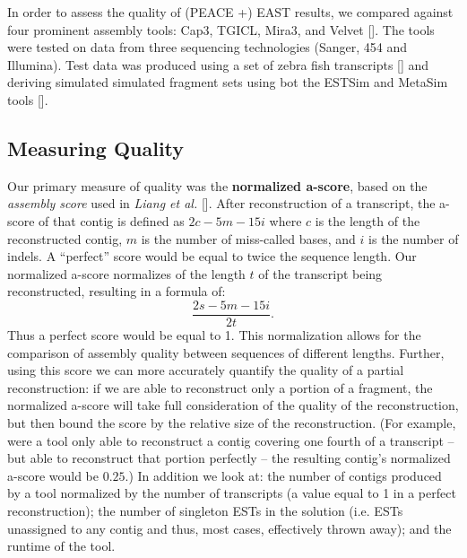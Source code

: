 \documentclass{bioinfo}
\newcommand{\peace} {{\small PEACE}}
\newcommand{\capthree} {{\small Cap3}}
\newcommand{\estsim}{{\small ESTSim}}
\newcommand{\metasim} {{\small MetaSim}}
\newcommand{\tgicl} {{\small TGICL}}
\newcommand{\east} {{\small EAST}}
\newcommand{\velvet}{{\small Velvet}}
\newcommand{\mira}{{\small Mira3}}
\begin{document}

In order to assess the quality of (\peace\/ +) \east\/ results, we
compared against four prominent assembly tools: \capthree, \tgicl,
\mira, and \velvet\/ [\cite{Huang99,Pertea03,Chevreux04,Zerbino08}].
The tools were tested on data from three sequencing technologies
(Sanger, 454 and Illumina).  Test data was produced using a set of
zebra fish transcripts [\cite{Hazelhurst08}] and deriving simulated
simulated fragment sets using bot the \estsim\/ and \metasim\/ tools
[\cite{Hazelhurst03,Richter08}].

\subsection*{Measuring Quality}
Our primary measure of quality was the {\bf normalized a-score}, based
on the {\it assembly score} used in {\it Liang et al.}
[\cite{Liang00}].  After reconstruction of a transcript,
the a-score of that contig is defined as $2c - 5m - 15i$ where $c$ is
the length of the reconstructed contig, $m$ is the number of
miss-called bases, and $i$ is the number of indels.  A ``perfect''
score would be equal to twice the sequence length.  Our normalized
a-score normalizes of the length $t$ of the transcript being
reconstructed, resulting in a formula of:
$$\frac{2s - 5m - 15i}{2t}.$$
Thus a perfect score would be equal to 1.  This normalization allows
for the comparison of assembly quality between sequences of different
lengths. Further, using this score we can more accurately quantify the
quality of a partial reconstruction: if we are able to reconstruct
only a portion of a fragment, the normalized a-score will take full
consideration of the quality of the reconstruction, but then bound the
score by the relative size of the reconstruction.  (For example, were
a tool only able to reconstruct a contig covering one fourth of a
transcript -- but able to reconstruct that portion perfectly -- the
resulting contig's normalized a-score would be $0.25$.)  In addition
we look at: the number of contigs produced by a tool normalized by the
number of transcripts (a value equal to 1 in a perfect
reconstruction); the number of singleton ESTs in the solution
(i.e. ESTs unassigned to any contig and thus, most cases, effectively
thrown away); and the runtime of the tool.
\end{document}
